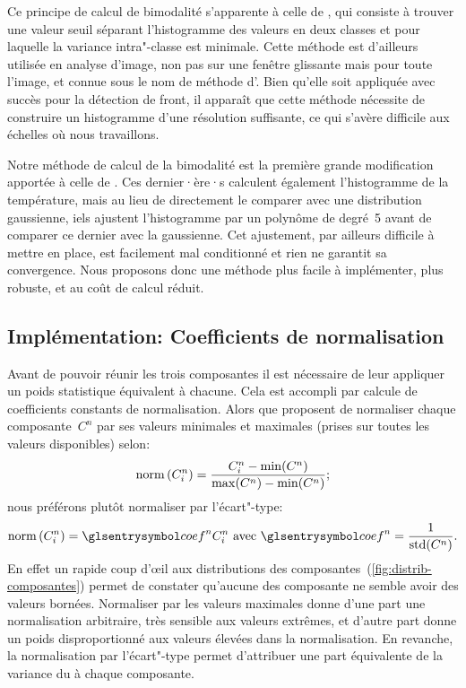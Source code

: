 Ce principe de calcul de bimodalité s'apparente à celle de \textcite{cayula_1992}, qui consiste à trouver une valeur seuil séparant l'histogramme des valeurs en deux classes et pour laquelle la variance intra"-classe est minimale.
Cette méthode est d'ailleurs utilisée en analyse d'image, non pas sur une fenêtre glissante mais pour toute l'image, et connue sous le nom de méthode d'\textcite{otsu_1979}.
Bien qu'elle soit appliquée avec succès pour la détection de front, il apparaît que cette méthode nécessite de construire un histogramme d'une résolution suffisante, ce qui s'avère difficile aux échelles où nous travaillons.

Notre méthode de calcul de la bimodalité est la première grande modification apportée à celle de \textcite{liu_2016}.
Ces dernier·ère·s calculent également l'histogramme de la température, mais au lieu de directement le comparer avec une distribution gaussienne, iels ajustent l'histogramme par un polynôme de degré~5 avant de comparer ce dernier avec la gaussienne.
Cet ajustement, par ailleurs difficile à mettre en place, est facilement mal conditionné et rien ne garantit sa convergence.
Nous proposons donc une méthode plus facile à implémenter, plus robuste, et au coût de calcul réduit.

\subsection{Implémentation: Coefficients de normalisation}
\label{sec:coef-normalisation}

Avant de pouvoir réunir les trois composantes il est nécessaire de leur appliquer un poids statistique équivalent à chacune. Cela est accompli par calcule de coefficients constants de normalisation.
Alors que \citeauthor{liu_2016} proposent de normaliser chaque composante~\(C^n\) par ses valeurs minimales et maximales (prises sur toutes les valeurs disponibles) selon:
\begin{equation}
  \operatorname{norm}\left(C_i^n\right) = \frac {C_i^n - \min(C^n)} {\max(C^n) - \min(C^n)} ;
\end{equation}
nous préférons plutôt normaliser par l'écart"-type:
\begin{equation}
  \norm{C_i^n} = \am{coef}^n C_i^n
  \text{ avec } \am{coef}^n = \frac {1} {\std(C^n)} .
\end{equation}
En effet un rapide coup d’œil aux distributions des composantes~(\cref{fig:distrib-composantes}) permet de constater qu'aucune des composante ne semble avoir des valeurs bornées.
Normaliser par les valeurs maximales donne d'une part une normalisation arbitraire, très sensible aux valeurs extrêmes, et d'autre part donne un poids disproportionné aux valeurs élevées dans la normalisation.
En revanche, la normalisation par l'écart"-type permet d'attribuer une part équivalente de la variance du  à chaque composante.

